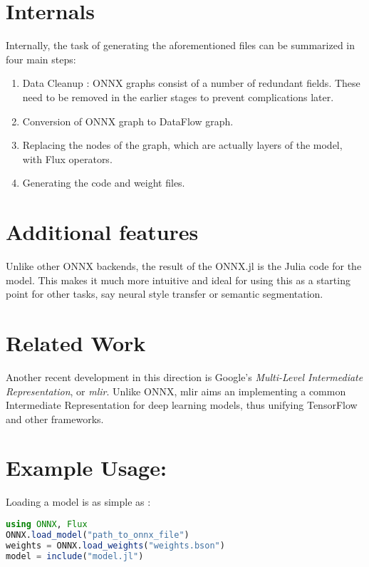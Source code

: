 \documentclass{juliacon}
\begin{document}
\section{Internals}

Internally, the task of generating the aforementioned files can be summarized in four main steps:

\begin{enumerate}
    \item Data Cleanup : ONNX graphs consist of a number of redundant fields. These need to be removed in the earlier stages to prevent complications later.
    \item Conversion of ONNX graph to DataFlow graph. 
    \item Replacing the nodes of the graph, which are actually layers of the model, with Flux operators.
    \item Generating the code and weight files.
\end{enumerate}

\section{Additional features}

Unlike other ONNX backends, the result of the ONNX.jl is the Julia code for the model. This makes it much more intuitive and ideal for using this as a starting point for other tasks, say neural style transfer or semantic segmentation.

\section{Related Work}

Another recent development in this direction is Google's \textit{Multi-Level Intermediate
Representation}, or \textit{mlir}. Unlike ONNX, mlir aims an implementing a common Intermediate Representation for deep learning models, thus unifying TensorFlow and other frameworks.

\section{Example Usage:}

Loading a model is as simple as :

\begin{lstlisting}[language=Julia]
using ONNX, Flux
ONNX.load_model("path_to_onnx_file")
weights = ONNX.load_weights("weights.bson")
model = include("model.jl")
\end{lstlisting}{}
\end{document}
